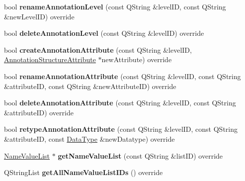 \begin{DoxyCompactItemize}
bool {\bfseries rename\+Annotation\+Level} (const Q\+String \&level\+ID, const Q\+String \&new\+Level\+ID) override
\item 
\mbox{\label{class_s_q_l_annotation_datastore_ad54bbf4cbd39dd82f5f80824afec8ad9}} 
bool {\bfseries delete\+Annotation\+Level} (const Q\+String \&level\+ID) override
\item 
\mbox{\label{class_s_q_l_annotation_datastore_acf770e877ba9070c1ccfeab89b749ec0}} 
bool {\bfseries create\+Annotation\+Attribute} (const Q\+String \&level\+ID, \hyperlink{class_annotation_structure_attribute}{Annotation\+Structure\+Attribute} $\ast$new\+Attribute) override
\item 
\mbox{\label{class_s_q_l_annotation_datastore_a8453891501bb572660b30fd2d05be956}} 
bool {\bfseries rename\+Annotation\+Attribute} (const Q\+String \&level\+ID, const Q\+String \&attribute\+ID, const Q\+String \&new\+Attribute\+ID) override
\item 
\mbox{\label{class_s_q_l_annotation_datastore_ac7bfe7e55029dc0c53eb1e33718056fd}} 
bool {\bfseries delete\+Annotation\+Attribute} (const Q\+String \&level\+ID, const Q\+String \&attribute\+ID) override
\item 
\mbox{\label{class_s_q_l_annotation_datastore_aa83510597b257b61325d96fa02d83ed2}} 
bool {\bfseries retype\+Annotation\+Attribute} (const Q\+String \&level\+ID, const Q\+String \&attribute\+ID, const \hyperlink{class_data_type}{Data\+Type} \&new\+Datatype) override
\item 
\mbox{\label{class_s_q_l_annotation_datastore_a6987d6933bea5d1a278d6b24ac4fdc50}} 
\hyperlink{class_name_value_list}{Name\+Value\+List} $\ast$ {\bfseries get\+Name\+Value\+List} (const Q\+String \&list\+ID) override
\item 
\mbox{\label{class_s_q_l_annotation_datastore_a64994dcf23dfd343e0ef82e8365c8c30}} 
Q\+String\+List {\bfseries get\+All\+Name\+Value\+List\+I\+Ds} () override
\item 
\mbox{\label{class_s_q_l_annotation_datastore_a41eae1589a2cdce0c8d8fa85371553eb}} 

\end{DoxyCompactItemize}
